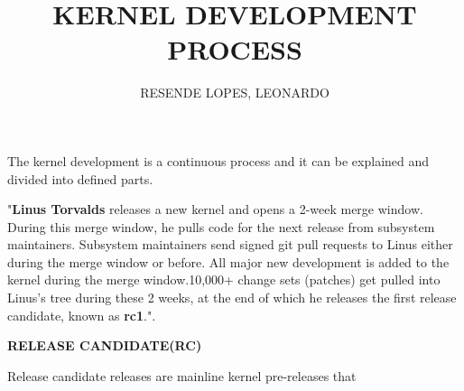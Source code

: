 \documentclass{slides}
\title{KERNEL DEVELOPMENT PROCESS}
\author{RESENDE LOPES, LEONARDO}
\begin{document}
\maketitle

\clearpage

The kernel development is a continuous process and it can be explained and divided into defined parts.

"\textbf{Linus Torvalds} releases a new kernel and opens a 2-week merge window. During this merge window, he pulls code for the next release from subsystem maintainers. Subsystem maintainers send signed git pull requests to Linus either during the merge window or before. All major new development is added to the kernel during the merge window.10,000+ change sets (patches) get pulled into Linus's tree during these 2 weeks, at the end of which he releases the first release candidate, known as \textbf{rc1}.".

\clearpage

\textbf{RELEASE CANDIDATE(RC)}

Release candidate releases are mainline kernel pre-releases that
\end{document}
